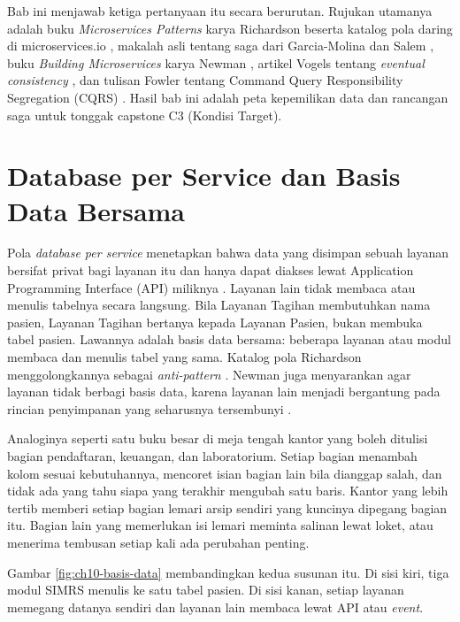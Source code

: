 Bab ini menjawab ketiga pertanyaan itu secara berurutan. Rujukan utamanya adalah buku
\textit{Microservices Patterns} karya Richardson \cite{richardson2018} beserta katalog pola daring
di microservices.io \cite{c10-richardson-dbps, c10-richardson-saga, c10-richardson-outbox},
makalah asli tentang saga dari Garcia-Molina dan Salem \cite{garcia-molina1987}, buku
\textit{Building Microservices} karya Newman \cite{newman2021}, artikel Vogels tentang
\textit{eventual consistency} \cite{c10-vogels2009}, dan tulisan Fowler tentang Command Query
Responsibility Segregation (CQRS) \cite{c10-fowler-cqrs}. Hasil bab ini adalah peta kepemilikan data
dan rancangan saga untuk tonggak capstone C3 (Kondisi Target).

\section{Database per Service dan Basis Data Bersama}
\label{sec:ch10-dbps}

Pola \textit{database per service} menetapkan bahwa data yang disimpan sebuah layanan bersifat
privat bagi layanan itu dan hanya dapat diakses lewat Application Programming Interface (API)
miliknya \cite{c10-richardson-dbps}. Layanan lain tidak membaca atau menulis tabelnya secara
langsung. Bila Layanan Tagihan membutuhkan nama pasien, Layanan Tagihan bertanya kepada Layanan
Pasien, bukan membuka tabel pasien. Lawannya adalah basis data bersama: beberapa layanan atau modul
membaca dan menulis tabel yang sama. Katalog pola Richardson menggolongkannya sebagai
\textit{anti-pattern} \cite{c10-richardson-dbps}. Newman juga menyarankan agar layanan tidak
berbagi basis data, karena layanan lain menjadi bergantung pada rincian penyimpanan yang seharusnya
tersembunyi \cite{newman2021}.

Analoginya seperti satu buku besar di meja tengah kantor yang boleh ditulisi bagian pendaftaran,
keuangan, dan laboratorium. Setiap bagian menambah kolom sesuai kebutuhannya, mencoret isian bagian
lain bila dianggap salah, dan tidak ada yang tahu siapa yang terakhir mengubah satu baris. Kantor
yang lebih tertib memberi setiap bagian lemari arsip sendiri yang kuncinya dipegang bagian itu.
Bagian lain yang memerlukan isi lemari meminta salinan lewat loket, atau menerima tembusan setiap
kali ada perubahan penting.

Gambar \ref{fig:ch10-basis-data} membandingkan kedua susunan itu. Di sisi kiri, tiga modul SIMRS
menulis ke satu tabel pasien. Di sisi kanan, setiap layanan memegang datanya sendiri dan layanan
lain membaca lewat API atau \textit{event}.

